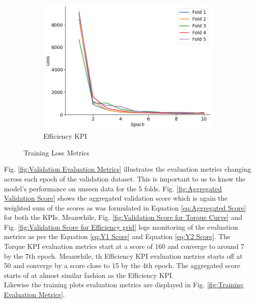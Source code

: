 \documentclass{report} %
\begin{document}
\begin{figure}[H]
\begin{subfigure}{0.32\textwidth}
        \centering
        \includegraphics[width=\textwidth]{./ReportImages/train_loss_y2.png}
        \caption{\centering Efficiency \ac{KPI}}
        \label{fig:Training Loss for Efficiency grid}
    \end{subfigure}
    \caption{Training Loss Metrics}
    \label{fig:Training Loss Metrics}
\end{figure}

Fig. \ref{fig:Validation Evaluation Metrics} illustrates the evaluation metrics changing across each epoch of the validation dataset. This is important to us to know 
the model's performance on unseen data for the 5 folds. Fig. \ref{fig:Aggregated Validation Score} shows the aggregated validation score which is again the weighted 
sum of the scores as was formulated in Equation \ref{eq:Aggregated Score} for both the \ac{KPI}s.
Meanwhile, Fig. \ref{fig:Validation Score for Torque Curve} and Fig. \ref{fig:Validation Score for Efficiency grid} logs monitoring of the evaluation metrics as per the 
Equation \ref{eq:Y1 Score} and Equation \ref{eq:Y2 Score}.
The Torque \ac{KPI} evaluation metrics start at a score of 160 and converge to around 7 by the 7th epoch. Meanwhile, th Efficiency \ac{KPI} evaluation metrics starts off at 
50 and converge by a score close to 15 by the 4th epoch. The aggregated score starts of at almost similar fashion as the Efficiency \ac{KPI}.\\
Likewise the training plots evaluation metrics are displayed in Fig. \ref{fig:Training Evaluation Metrics}.
\end{document}
